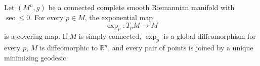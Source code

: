 Let \((M^n,g)\) be a connected complete smooth Riemannian manifold with \(\sec\le0\). For every \(p\in M\), the exponential map
\[
\exp_p:T_pM\longrightarrow M
\]
is a covering map. If \(M\) is simply connected, \(\exp_p\) is a global diffeomorphism for every \(p\), \(M\) is diffeomorphic to \(\mathbb R^n\), and every pair of points is joined by a unique minimizing geodesic.